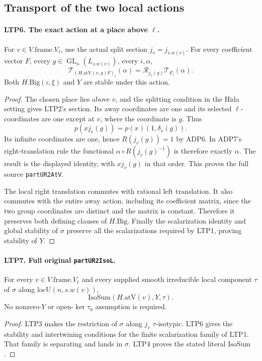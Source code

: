 \subsection{Transport of the two local actions}

\paragraph{LTP6. The exact action at a place above \(\ell\).}
\label{claim:LTP6}
For \(v\in V.\mathrm{frame}.V_\ell\), use the actual split section
\(j_v=j_{s.w(v)}\).  For every coefficient vector \(F\), every
\(g\in\operatorname{GL}_n(L_{s.w(v)})\), every \(i,\alpha\),
\[
 \mathcal T_{(H.\mathrm{atV}(v,g)F)_i}(\alpha)
                 =\mathscr R_{j_v(g)}\mathcal T_{F_i}(\alpha).
\]
Both \(H.\mathrm{Big}(\iota,\xi)\) and \(Y\) are stable under this
action.
\begin{proof}
The chosen place lies above \(v\), and the splitting condition in
the Hida setting gives LTP2's section.  Its away coordinates are
one and its selected \(\ell\)-coordinates are one except at \(v\),
where the coordinate is \(g\).  Thus
\[
             p(xj_v(g))=p(x)(1,\delta_v(g)).
\]
Its infinite coordinates are one, hence \(R(j_v(g))=1\) by ADP6.
In ADP7's right-translation rule the functional
\(\alpha\circ R(j_v(g)^{-1})\) is therefore exactly \(\alpha\).
The result is the displayed identity, with \(xj_v(g)\) in that
order.  This proves the full source \texttt{partUR2AtV}.

The local right translation commutes with rational left
translation.  It also commutes with the entire away action,
including its coefficient matrix, since the two group coordinates
are distinct and the matrix is constant.  Therefore it preserves
both defining clauses of \(H.\mathrm{Big}\).  Finally the
scalarization identity and global stability of \(\sigma\) preserve
all the scalarizations required by LTP1, proving stability of \(Y\).
\end{proof}

\paragraph{LTP7. Full original \texttt{partUR2IsoL}.}
\label{claim:LTP7}
For every \(v\in V.\mathrm{frame}.V_\ell\) and every supplied smooth
irreducible local component \(\tau\) of \(\sigma\) along
\(\mathrm{locU}(n,s.w(v))\),
\[
                  \mathrm{IsoSum}(H.\mathrm{atV}(v),Y,\tau).
\]
No nonzero-\(Y\) or open-\(\ker\tau_0\) assumption is required.
\begin{proof}
LTP3 makes the restriction of \(\sigma\) along \(j_v\)
\(\tau\)-isotypic.  LTP6 gives the stability and intertwining
conditions for the finite scalarization family of LTP1.
That family is separating and lands in \(\sigma\).
LTP4 proves the stated literal \(\mathrm{IsoSum}\).
\end{proof}

